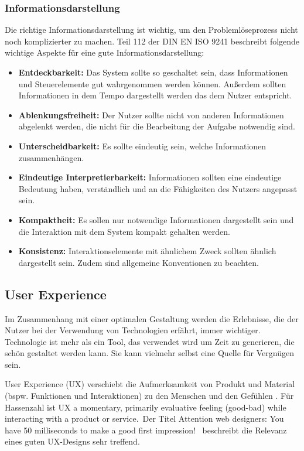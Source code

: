 \subsubsection*{Informationsdarstellung}
Die richtige Informationsdarstellung ist wichtig, um den Problemlöseprozess nicht noch komplizierter zu machen. Teil 112 \cite{ISO9241-112} der DIN EN ISO 9241 beschreibt folgende wichtige Aspekte für eine gute Informationsdarstellung:
\begin{itemize}
\item \textbf{Entdeckbarkeit:} Das System sollte so geschaltet sein, dass Informationen und Steuerelemente gut wahrgenommen werden können. Außerdem sollten Informationen in dem Tempo dargestellt werden das dem Nutzer entspricht.
\item \textbf{Ablenkungsfreiheit:} Der Nutzer sollte nicht von anderen Informationen abgelenkt werden, die nicht für die Bearbeitung der Aufgabe notwendig sind.
\item \textbf{Unterscheidbarkeit:} Es sollte eindeutig sein, welche Informationen zusammenhängen.
\item \textbf{Eindeutige Interpretierbarkeit:} Informationen sollten eine eindeutige Bedeutung haben, verständlich und an die Fähigkeiten des Nutzers angepasst sein.
\item \textbf{Kompaktheit:} Es sollen nur notwendige Informationen dargestellt sein und die Interaktion mit dem System kompakt gehalten werden.
\item \textbf{Konsistenz:} Interaktionselemente mit ähnlichem Zweck sollten ähnlich dargestellt sein. Zudem sind allgemeine Konventionen zu beachten.
\end{itemize}

\subsection{User Experience}
Im Zusammenhang mit einer optimalen Gestaltung werden die Erlebnisse, die der Nutzer bei der Verwendung von Technologien erfährt, immer wichtiger. Technologie ist mehr als ein Tool, das verwendet wird um Zeit zu generieren, die schön gestaltet werden kann. Sie kann vielmehr selbst eine Quelle für Vergnügen sein. \cite{Hassenzahl2008}

User Experience (UX) verschiebt die Aufmerksamkeit von Produkt und Material (bspw. Funktionen und Interaktionen) zu den Menschen und den Gefühlen \cite{Hassenzahl2008}. Für Hassenzahl \citep[12]{Hassenzahl2008} ist UX \glqq a momentary, primarily evaluative feeling (good-bad) while interacting with a product or service.\grqq \ Der Titel \glqq Attention web designers: You have 50 milliseconds to make a good first impression!\grqq \ \citep[92]{Hassenzahl2006} beschreibt die Relevanz eines guten UX-Designs sehr treffend. 
\cite{Hassenzahl2006}

